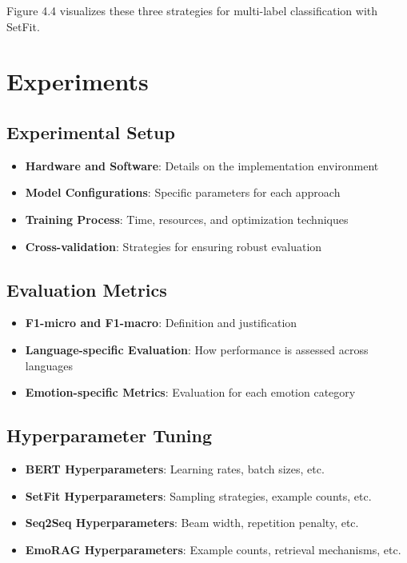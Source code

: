 \documentclass[a4paper,12pt]{extarticle}
\begin{document}
Figure 4.4 visualizes these three strategies for multi-label classification with SetFit.

\section{Experiments}

\subsection{Experimental Setup}
\begin{itemize}
\item \textbf{Hardware and Software}: Details on the implementation environment
\item \textbf{Model Configurations}: Specific parameters for each approach
\item \textbf{Training Process}: Time, resources, and optimization techniques
\item \textbf{Cross-validation}: Strategies for ensuring robust evaluation
\end{itemize}

\subsection{Evaluation Metrics}
\begin{itemize}
\item \textbf{F1-micro and F1-macro}: Definition and justification
\item \textbf{Language-specific Evaluation}: How performance is assessed across languages
\item \textbf{Emotion-specific Metrics}: Evaluation for each emotion category
\end{itemize}

\subsection{Hyperparameter Tuning}
\begin{itemize}
\item \textbf{BERT Hyperparameters}: Learning rates, batch sizes, etc.
\item \textbf{SetFit Hyperparameters}: Sampling strategies, example counts, etc.
\item \textbf{Seq2Seq Hyperparameters}: Beam width, repetition penalty, etc.
\item \textbf{EmoRAG Hyperparameters}: Example counts, retrieval mechanisms, etc.
\end{itemize}
\end{document}
